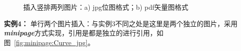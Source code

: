 \begin{figure}[ht!]
    \centering
    \caption{插入竖排两列图片：a) jpg位图格式；b) pdf矢量图格式}
    \label{fig:twoColns}
\end{figure}




{\bf{实例4：}} 单行两个图片插入：与实例3不同之处是这里是两个独立的图片，采用{\it\bf{minipage}}方式实现，引用是都是独立的进行引用，如图~\ref{fig:minipage:Curve_jpg}。

